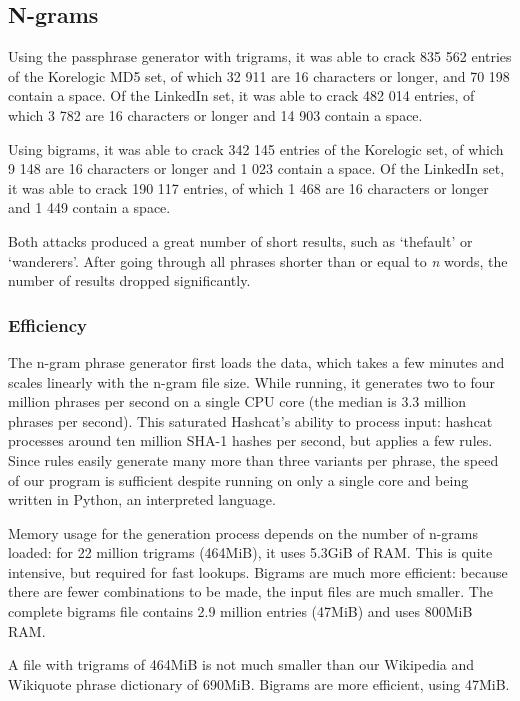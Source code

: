 \documentclass{article}
\begin{document}
\subsection{N-grams}


Using the passphrase generator with trigrams, it was able to crack 835 562
entries of the Korelogic MD5 set, of which 32 911 are 16 characters or longer,
and 70 198 contain a space. Of the LinkedIn set, it was able to crack 482 014
entries, of which 3 782 are 16 characters or longer and 14 903 contain a space.

Using bigrams, it was able to crack 342 145 entries of the Korelogic set, of
which 9 148 are 16 characters or longer and 1 023 contain a space. Of the
LinkedIn set, it was able to crack 190 117 entries, of which 1 468 are 16
characters or longer and 1 449 contain a space.

Both attacks produced a great number of short results, such as `thefault' or
`wanderers'. After going through all phrases shorter than or equal to {\it n}
words, the number of results dropped significantly.

\subsubsection{Efficiency}

The n-gram phrase generator first loads the data, which takes a few minutes and
scales linearly with the n-gram file size. While running, it generates two to
four million phrases per second on a single CPU core (the median is 3.3 million
phrases per second). This saturated Hashcat's ability to process input: hashcat
processes around ten million SHA-1 hashes per second, but applies a few rules.
Since rules easily generate many more than three variants per phrase, the speed
of our program is sufficient despite running on only a single core and being
written in Python, an interpreted language.

Memory usage for the generation process depends on the number of n-grams
loaded: for 22 million trigrams (464MiB), it uses 5.3GiB of RAM. This is quite
intensive, but required for fast lookups. Bigrams are much more efficient:
because there are fewer combinations to be made, the input files are much
smaller. The complete bigrams file contains 2.9 million entries (47MiB) and
uses 800MiB RAM.

A file with trigrams of 464MiB is not much smaller than our Wikipedia and
Wikiquote phrase dictionary of 690MiB. Bigrams are more efficient, using 47MiB.
\end{document}
